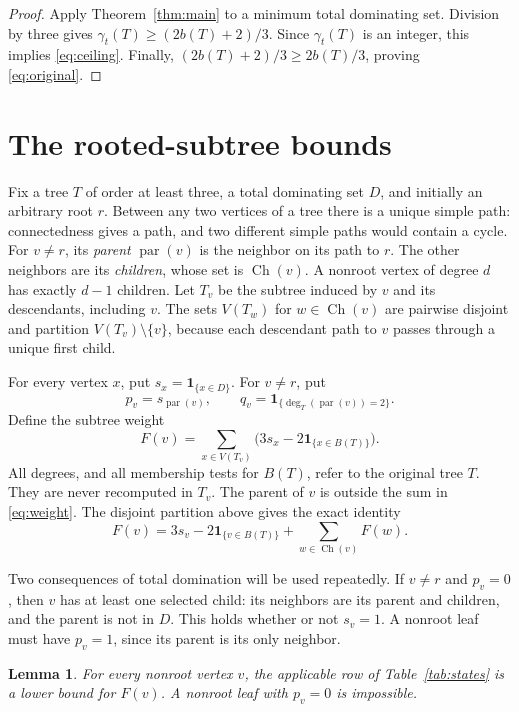 \documentclass[11pt,a4paper]{article}
\newtheorem{lemma}[theorem]{Lemma}
\theoremstyle{remark}
\newcommand{\td}{\gamma_t}
\newcommand{\BB}{B}
\newcommand{\ind}{\mathbf{1}}
\newcommand{\parv}{\operatorname{par}}
\newcommand{\ch}{\operatorname{Ch}}
\begin{document}
\begin{proof}
Apply Theorem~\ref{thm:main} to a minimum total dominating set.
Division by three gives $\td(T)\ge(2b(T)+2)/3$. Since
$\td(T)$ is an integer, this implies \eqref{eq:ceiling}. Finally,
$(2b(T)+2)/3\ge 2b(T)/3$, proving \eqref{eq:original}.
\end{proof}

\section{The rooted-subtree bounds}
\label{sec:local}

Fix a tree $T$ of order at least three, a total dominating set $D$,
and initially an arbitrary root $r$. Between any two vertices of a
tree there is a unique simple path: connectedness gives a path, and
two different simple paths would contain a cycle. For $v\ne r$, its
\emph{parent} $\parv(v)$ is the neighbor on its path to $r$.
The other neighbors are its \emph{children}, whose set is
$\ch(v)$. A nonroot vertex of degree $d$ has exactly $d-1$
children. Let $T_v$ be the subtree induced by $v$ and its descendants,
including $v$. The sets $V(T_w)$ for $w\in\ch(v)$ are pairwise
disjoint and partition $V(T_v)\setminus\{v\}$, because each descendant
path to $v$ passes through a unique first child.

For every vertex $x$, put $s_x=\ind_{\{x\in D\}}$. For $v\ne r$, put
\[
 p_v=s_{\parv(v)},\qquad
 q_v=\ind_{\{\deg_T(\parv(v))=2\}}.
\]
Define the subtree weight
\begin{equation}\label{eq:weight}
 F(v)=\sum_{x\in V(T_v)}\bigl(3s_x-2\ind_{\{x\in\BB(T)\}}\bigr).
\end{equation}
All degrees, and all membership tests for $\BB(T)$, refer to the
original tree $T$. They are never recomputed in $T_v$.
The parent of $v$ is outside the sum in \eqref{eq:weight}.
The disjoint partition above gives the exact identity
\begin{equation}\label{eq:recurrence}
 F(v)=3s_v-2\ind_{\{v\in\BB(T)\}}+
       \sum_{w\in\ch(v)}F(w).
\end{equation}

Two consequences of total domination will be used repeatedly. If
$v\ne r$ and $p_v=0$, then $v$ has at least one selected child:
its neighbors are its parent and children, and the parent is not in
$D$. This holds whether or not $s_v=1$. A nonroot leaf must
have $p_v=1$, since its parent is its only neighbor.

\begin{lemma}\label{lem:states}
For every nonroot vertex $v$, the applicable row of Table~\ref{tab:states}
is a lower bound for $F(v)$. A nonroot leaf with $p_v=0$ is impossible.
\end{lemma}
\end{document}
